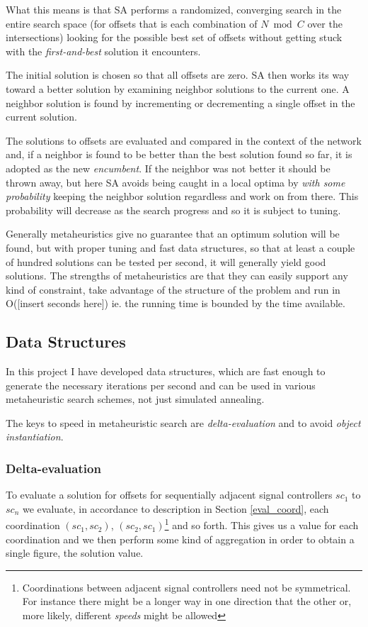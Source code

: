 What this means is that SA performs a randomized, converging search in the entire search space (for offsets that is each combination of $N \bmod C$ over the intersections) looking for the possible best set of offsets without getting stuck with the \textit{first-and-best} solution it encounters.

The initial solution is chosen so that all offsets are zero. SA then works its way toward a better solution by examining neighbor solutions to the current one. A neighbor solution is found by incrementing or decrementing a single offset in the current solution.

The solutions to offsets are evaluated and compared in the context of the network and, if a neighbor is found to be better than the best solution found so far, it is adopted as the new \textit{encumbent}. If the neighbor was not better it should be thrown away, but here SA avoids being caught in a local optima by \textit{with some probability} keeping the neighbor solution regardless and work on from there. This probability will decrease as the search progress and so it is subject to tuning.

Generally metaheuristics give no guarantee that an optimum solution will be found, but with proper tuning and fast data structures, so that at least a couple of hundred solutions can be tested per second, it will generally yield good solutions. The strengths of metaheuristics are that they can easily support any kind of constraint, take advantage of the structure of the problem and run in O([insert seconds here]) ie. the running time is bounded by the time available.

\subsection*{Data Structures}
In this project I have developed data structures, which are fast enough to generate the necessary iterations per second and can be used in various metaheuristic search schemes, not just simulated annealing.

The keys to speed in metaheuristic search are \textit{delta-evaluation} and to avoid \textit{object instantiation}.

\subsubsection*{Delta-evaluation}
To evaluate a solution for offsets for sequentially adjacent signal controllers $sc_1$ to $sc_n$ we evaluate, in accordance to description in Section \ref{eval_coord}, each coordination $(sc_1,sc_2)$, $(sc_2,sc_1)$\footnote{Coordinations between adjacent signal controllers need not be symmetrical. For instance there might be a longer way in one direction that the other or, more likely, different \textit{speeds} might be allowed} and so forth. This gives us a value for each coordination and we then perform some kind of aggregation in order to obtain a single figure, the solution value.

